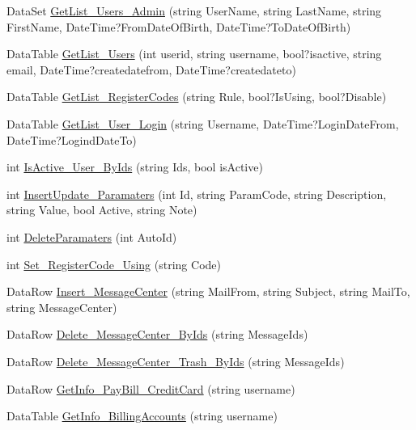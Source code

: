 \begin{DoxyCompactItemize}
\item 
Data\-Set \hyperlink{class_d_b_class_a5988e32a4d26e9369010d22c45cd5047}{Get\-List\-\_\-\-Users\-\_\-\-Admin} (string User\-Name, string Last\-Name, string First\-Name, Date\-Time?From\-Date\-Of\-Birth, Date\-Time?To\-Date\-Of\-Birth)
\item 
Data\-Table \hyperlink{class_d_b_class_a878b22ac712481c277f9178b1b43fe07}{Get\-List\-\_\-\-Users} (int userid, string username, bool?isactive, string email, Date\-Time?createdatefrom, Date\-Time?createdateto)
\item 
Data\-Table \hyperlink{class_d_b_class_a5b9b462ffd2a0818dd1198a5d85db9b0}{Get\-List\-\_\-\-Register\-Codes} (string Rule, bool?Is\-Using, bool?Disable)
\item 
Data\-Table \hyperlink{class_d_b_class_a2d6d02138ea4f327cf81801671551727}{Get\-List\-\_\-\-User\-\_\-\-Login} (string Username, Date\-Time?Login\-Date\-From, Date\-Time?Logind\-Date\-To)
\item 
int \hyperlink{class_d_b_class_a4c5f9a9dc76a0b8585eeaf9fd3dcda9e}{Is\-Active\-\_\-\-User\-\_\-\-By\-Ids} (string Ids, bool is\-Active)
\item 
int \hyperlink{class_d_b_class_aa3330dd5a4961020f5da0bf0d0c66695}{Insert\-Update\-\_\-\-Paramaters} (int Id, string Param\-Code, string Description, string Value, bool Active, string Note)
\item 
int \hyperlink{class_d_b_class_a7ccd4c71dd6fae6380139ec0090d9b61}{Delete\-Paramaters} (int Auto\-Id)
\item 
int \hyperlink{class_d_b_class_aa77b93fa5b15252418e3fd8e24ffd8ac}{Set\-\_\-\-Register\-Code\-\_\-\-Using} (string Code)
\item 
Data\-Row \hyperlink{class_d_b_class_a14e9b463bcc808a13b42d55caca9b4ac}{Insert\-\_\-\-Message\-Center} (string Mail\-From, string Subject, string Mail\-To, string Message\-Center)
\item 
Data\-Row \hyperlink{class_d_b_class_a7db629c9df6c2c852dcf7eea76fb14a9}{Delete\-\_\-\-Message\-Center\-\_\-\-By\-Ids} (string Message\-Ids)
\item 
Data\-Row \hyperlink{class_d_b_class_a701df7b6a8ca9fc4ba08897cae80dfe8}{Delete\-\_\-\-Message\-Center\-\_\-\-Trash\-\_\-\-By\-Ids} (string Message\-Ids)
\item 
Data\-Row \hyperlink{class_d_b_class_a615a48cab9c51ef041a71bf4448cf4c4}{Get\-Info\-\_\-\-Pay\-Bill\-\_\-\-Credit\-Card} (string username)
\item 
Data\-Table \hyperlink{class_d_b_class_a55a667ccc7d91f17f481a874f287890f}{Get\-Info\-\_\-\-Billing\-Accounts} (string username)

\end{DoxyCompactItemize}
